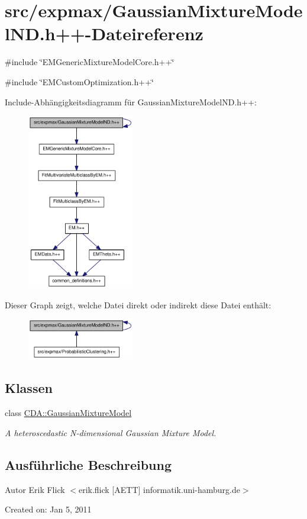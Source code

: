 \hypertarget{GaussianMixtureModelND_8h_09_09}{
\section{src/expmax/GaussianMixtureModelND.h++-\/Dateireferenz}
\label{GaussianMixtureModelND_8h_09_09}
}
{\ttfamily \#include \char`\"{}EMGenericMixtureModelCore.h++\char`\"{}}\par
{\ttfamily \#include \char`\"{}EMCustomOptimization.h++\char`\"{}}\par
Include-\/Abhängigkeitsdiagramm für GaussianMixtureModelND.h++:\nopagebreak
\begin{figure}[H]
\begin{center}
\leavevmode
\includegraphics[width=133pt]{GaussianMixtureModelND_8h_09_09__incl}
\end{center}
\end{figure}
Dieser Graph zeigt, welche Datei direkt oder indirekt diese Datei enthält:\nopagebreak
\begin{figure}[H]
\begin{center}
\leavevmode
\includegraphics[width=133pt]{GaussianMixtureModelND_8h_09_09__dep__incl}
\end{center}
\end{figure}
\subsection*{Klassen}
\begin{DoxyCompactItemize}
\item 
class \hyperlink{classCDA_1_1GaussianMixtureModel}{CDA::GaussianMixtureModel}
\begin{DoxyCompactList}\small\item\em A heteroscedastic N-\/dimensional Gaussian Mixture Model. \item\end{DoxyCompactList}\end{DoxyCompactItemize}


\subsection{Ausführliche Beschreibung}
\begin{DoxyAuthor}{Autor}
Erik Flick $<$erik.flick \mbox{[}AETT\mbox{]} informatik.uni-\/hamburg.de$>$
\end{DoxyAuthor}
Created on: Jan 5, 2011 